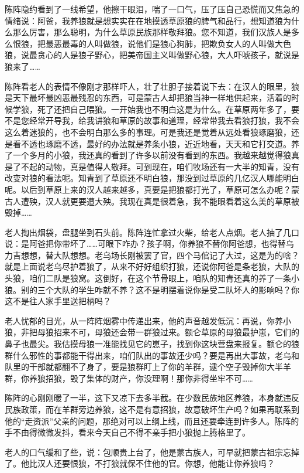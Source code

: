 \par 陈阵隐约看到了一线希望，他擦干眼泪，喘了一口气，压了压自己恐慌而又焦急的情绪说：阿爸，我养狼就是想实实在在地摸透草原狼的脾气和品行，想知道狼为什么那么厉害，那么聪明，为什么草原民族那样敬拜狼。您不知道，我们汉族人是多么恨狼，把最恶最毒的人叫做狼，说他们是狼心狗肺，把欺负女人的人叫做大色狼，说最贪心的人是狼子野心，把美帝国主义叫做野心狼，大人吓唬孩子，就说是狼来了……
\par 陈阵看老人的表情不像刚才那样吓人，壮了壮胆子接着说下去：在汉人的眼里，狼是天下最坏最凶恶最残忍的东西，可是蒙古人却把狼当神一样地供起来，活着的时候学狼，死了还把自己喂狼。一开始我也不明白这是为什么。在草原两年多了，要不是您经常开导我，给我讲狼和草原的故事和道理，经常带我去看狼打狼，我不会这么着迷狼的，也不会明白那么多的事理。可是我还是觉着从远处看狼琢磨狼，还是看不透也琢磨不透，最好的办法就是养条小狼，近近地看，天天和它打交道。养了一个多月的小狼，我还真的看到了许多以前没有看到的东西。我越来越觉得狼真是了不起的动物，真是值得人敬拜。可到现在，咱们牧场还有一大半的知青，没有改变对狼的看法呢。知青到了草原还不明白狼，那没到过草原的几亿汉人哪能明白呢。以后到草原上来的汉人越来越多，真要是把狼都打光了，草原可怎么办呢？蒙古人遭殃，汉人就更要遭大殃。我现在真是很着急，我不能眼看着这么美的草原被毁掉……
\par 老人掏出烟袋，盘腿坐到石头前。陈阵连忙拿过火柴，给老人点烟。老人抽了几口说：是阿爸把你带坏了……可眼下咋办？孩子啊，你养狼不替你阿爸想，也得替乌力吉想想，替大队想想。老乌场长刚被罢了官，四个马倌记了大过，这是为的啥？就是上面说老乌尽护着狼了，从来不好好组织打狼，还说你阿爸是条老狼，大队的头狼，咱们二队是狼窝。这倒好，在这个节骨眼上，咱队的知青还真的养了一条小狼。别的三个大队的学生咋就不养？这不是明摆着说你是受二队坏人的影响吗？你这不是往人家手里送把柄吗？
\par 老人忧郁的目光，从一阵阵烟雾中传递出来，他的声音越发低沉：再说，你养小狼，非把母狼招来不可，母狼还会带一群狼过来。额仑草原的母狼最护崽，它们的鼻子也最尖。我估摸母狼一准能找见它的崽子，找到你这块营盘来报复。额仑的狼群什么邪性的事都能干得出来，咱们队出的事故还少吗？要是再出大事故，老乌和队里的干部就都翻不了身了，要是狼群盯上了你的羊群，逮个空子毁掉你大半羊群，你养狼招狼，毁了集体的财产，你没理啊！那你非得坐牢不可……
\par 陈阵的心刚刚暖了一半，这下又凉下去多半截。在少数民族地区养狼，本身就违反民族政策，而在羊群旁边养狼，这不是有意招狼，故意破坏生产吗？如果再联系到他的“走资派”父亲的问题，那绝对可以上纲上线，而且还要牵连到许多人。陈阵的手不由得微微发抖，看来今天自己不得不亲手把小狼抛上腾格里了。
\par 老人的口气缓和了些，说：包顺贵上台了，他是蒙古族人，可早就把蒙古祖宗忘掉了。他比汉人还要恨狼，不打狼就保不住他的官。你想，他能让你养狼吗？
